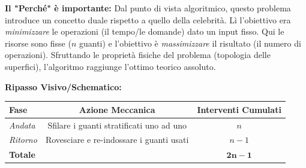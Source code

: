 \documentclass[a4paper, 11pt]{report}
\begin{document}
\textbf{Il "Perché" è importante:}
Dal punto di vista algoritmico, questo problema introduce un concetto duale rispetto a quello della celebrità. Lì l'obiettivo era \textit{minimizzare} le operazioni (il tempo/le domande) dato un input fisso. Qui le risorse sono fisse ($n$ guanti) e l'obiettivo è \textit{massimizzare} il risultato (il numero di operazioni). Sfruttando le proprietà fisiche del problema (topologia delle superfici), l'algoritmo raggiunge l'ottimo teorico assoluto.

\textbf{Ripasso Visivo/Schematico:}
\begin{center}
\begin{tabular}{|l|c|c|}
\hline
\textbf{Fase} & \textbf{Azione Meccanica} & \textbf{Interventi Cumulati} \\
\hline
\textit{Andata} & Sfilare i guanti stratificati uno ad uno & $n$ \\
\hline
\textit{Ritorno} & Rovesciare e re-indossare i guanti usati & $n - 1$ \\
\hline
\textbf{Totale} & & $\mathbf{2n - 1}$ \\
\hline
\end{tabular}
\end{center}
\end{document}
